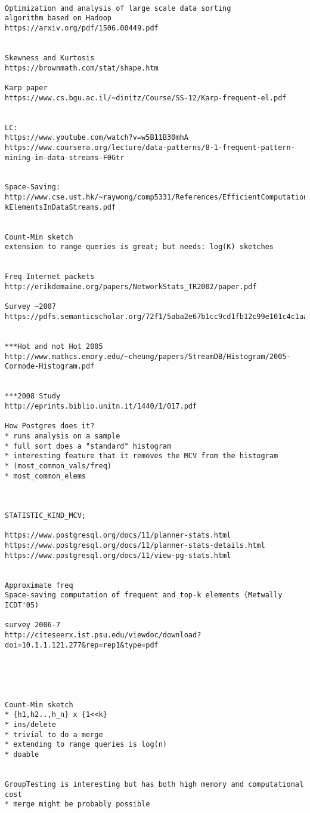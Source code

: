 \documentclass{beamer}
\begin{document}
\begin{verbatim}

Optimization and analysis of large scale data sorting
algorithm based on Hadoop
https://arxiv.org/pdf/1506.00449.pdf


Skewness and Kurtosis
https://brownmath.com/stat/shape.htm

Karp paper
https://www.cs.bgu.ac.il/~dinitz/Course/SS-12/Karp-frequent-el.pdf


LC:
https://www.youtube.com/watch?v=w5B11B30mhA
https://www.coursera.org/lecture/data-patterns/8-1-frequent-pattern-mining-in-data-streams-F0Gtr


Space-Saving:
http://www.cse.ust.hk/~raywong/comp5331/References/EfficientComputationOfFrequentAndTop-kElementsInDataStreams.pdf


Count-Min sketch
extension to range queries is great; but needs: log(K) sketches


Freq Internet packets
http://erikdemaine.org/papers/NetworkStats_TR2002/paper.pdf

Survey ~2007
https://pdfs.semanticscholar.org/72f1/5aba2e67b1cc9cd1fb12c99e101c4c1aae4b.pdf


***Hot and not Hot 2005
http://www.mathcs.emory.edu/~cheung/papers/StreamDB/Histogram/2005-Cormode-Histogram.pdf


***2008 Study 
http://eprints.biblio.unitn.it/1440/1/017.pdf

How Postgres does it?
* runs analysis on a sample
* full sort does a "standard" histogram
* interesting feature that it removes the MCV from the histogram
* (most_common_vals/freq) 
* most_common_elems 



STATISTIC_KIND_MCV;

https://www.postgresql.org/docs/11/planner-stats.html
https://www.postgresql.org/docs/11/planner-stats-details.html
https://www.postgresql.org/docs/11/view-pg-stats.html


Approximate freq 
Space-saving computation of frequent and top-k elements (Metwally ICDT'05)

survey 2006-7
http://citeseerx.ist.psu.edu/viewdoc/download?doi=10.1.1.121.277&rep=rep1&type=pdf





Count-Min sketch
* {h1,h2..,h_n} x {1<<k}
* ins/delete
* trivial to do a merge
* extending to range queries is log(n)
* doable


GroupTesting is interesting but has both high memory and computational cost
* merge might be probably possible



\end{verbatim}
\end{document}
